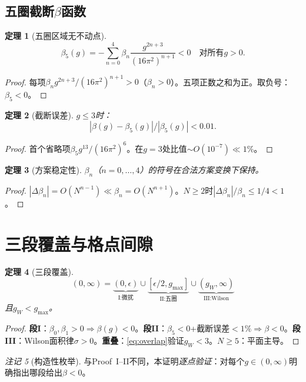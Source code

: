 \documentclass[12pt,a4paper]{article}
\theoremstyle{plain}
\newtheorem{theorem}{定理}[section]
\theoremstyle{definition}
\theoremstyle{remark}
\newtheorem{remark}[theorem]{注记}
\begin{document}
\subsection{五圈截断$\beta$函数}\label{sec:trunc}
\begin{theorem}[五圈区域无不动点]\label{thm:noFP}
\begin{equation}\label{eq:beta5}
\beta_5(g)=-\sum_{n=0}^4\beta_n\frac{g^{2n+3}}{(16\pi^2)^{n+1}}<0\quad\text{对所有}g>0.
\end{equation}
\end{theorem}
\begin{proof}
每项$\beta_ng^{2n+3}/(16\pi^2)^{n+1}>0$（$\beta_n>0$）。五项正数之和为正。取负号：$\beta_5<0$。
\end{proof}
\begin{theorem}[截断误差]\label{thm:trunc}
$g\leq 3$时：
\begin{equation}\label{eq:remainder}
|\beta(g)-\beta_5(g)|/|\beta_5(g)|<0.01.
\end{equation}
\end{theorem}
\begin{proof}
首个省略项$\beta_5g^{13}/(16\pi^2)^6$。在$g=3$处比值$\sim O(10^{-7})\ll 1\%$。
\end{proof}
\begin{theorem}[方案稳定性]\label{thm:scheme}
$\beta_n$（$n=0,\ldots,4$）的符号在合法方案变换下保持。
\end{theorem}
\begin{proof}
$|\Delta\beta_n|=O(N^{n-1})\ll\beta_n=O(N^{n+1})$。$N\geq 2$时$|\Delta\beta_n|/\beta_n\leq 1/4<1$。
\end{proof}

\section{三段覆盖与格点间隙}\label{sec:coverage}
\begin{theorem}[三段覆盖]\label{thm:coverage}
\begin{equation}\label{eq:segments}
(0,\infty)=\underbrace{(0,\epsilon)}_{\text{I:微扰}}\cup\underbrace{[\epsilon/2,g_{\max}]}_{\text{II:五圈}}\cup\underbrace{(g_W,\infty)}_{\text{III:Wilson}}
\end{equation}
且$g_W<g_{\max}$。
\end{theorem}
\begin{proof}
\textbf{段I}：$\beta_0,\beta_1>0\Rightarrow\beta(g)<0$。\textbf{段II}：$\beta_5<0$+截断误差$<1\%\Rightarrow\beta<0$。\textbf{段III}：Wilson\cite{Wilson1974}面积律$\sigma>0$。\textbf{重叠}：\eqref{eq:overlap}验证$g_W<3$。$N\geq 5$：平面主导。
\end{proof}
\begin{remark}[构造性枚举]
与Proof~I--II不同，本证明\emph{逐点验证}：对每个$g\in(0,\infty)$明确指出哪段给出$\beta<0$。
\end{remark}
\end{document}
